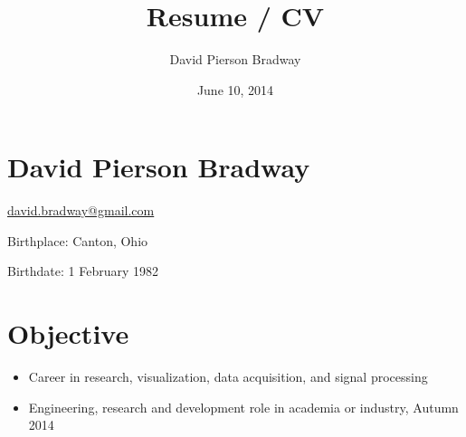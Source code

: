 \documentclass[letterpaper,10pt,english]{sphinxmanual}
\title{Resume / CV}
\date{June 10, 2014}
\author{David Pierson Bradway}
\begin{document}
\maketitle
\tableofcontents
{}\label{index::doc}



\chapter{David Pierson Bradway}
\label{resume:web-enhanced-resume-cv}\label{resume::doc}\label{resume:david-pierson-bradway}
\begin{DUlineblock}{0em}
\item[] \href{mailto:david.bradway@gmail.com}{david.bradway@gmail.com}
\item[] Birthplace: Canton, Ohio
\item[] Birthdate: 1 February 1982
\end{DUlineblock}


\chapter{Objective}
\label{resume:objective}\begin{itemize}
\item {} 
Career in research, visualization, data acquisition, and signal
processing

\item {} 
Engineering, research and development role in academia or industry,
Autumn 2014

\end{itemize}
\end{document}
